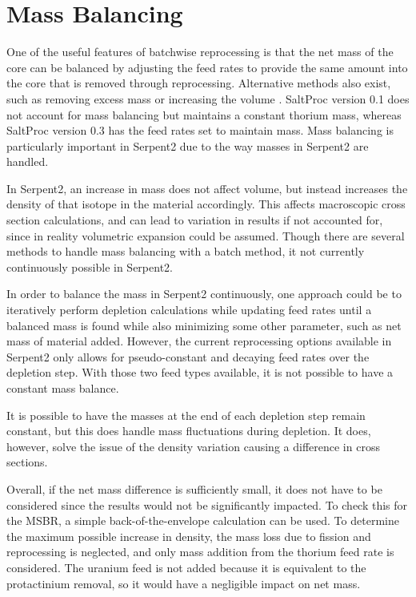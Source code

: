 \section{Mass Balancing}

One of the useful features of batchwise reprocessing is that the net mass of the core can be balanced by adjusting the feed rates to provide the same amount into the core that is removed through reprocessing. Alternative methods also exist, such as removing excess mass or increasing the volume \cite{ridley_method_2017}. SaltProc version 0.1 does not account for mass balancing but maintains a constant thorium mass, whereas SaltProc version 0.3 has the feed rates set to maintain mass. Mass balancing is particularly important in Serpent2 due to the way masses in Serpent2 are handled.

In Serpent2, an increase in mass does not affect volume, but instead increases the density of that isotope in the material accordingly. This affects macroscopic cross section calculations, and can lead to variation in results if not accounted for, since in reality volumetric expansion could be assumed. Though there are several methods to handle mass balancing with a batch method, it not currently continuously possible in Serpent2.

In order to balance the mass in Serpent2 continuously, one approach could be to iteratively perform depletion calculations while updating feed rates until a balanced mass is found while also minimizing some other parameter, such as net mass of material added. However, the current reprocessing options available in Serpent2 only allows for pseudo-constant and decaying feed rates over the depletion step. With those two feed types available, it is not possible to have a constant mass balance.

It is possible to have the masses at the end of each depletion step remain constant, but this does handle mass fluctuations during depletion. It does, however, solve the issue of the density variation causing a difference in cross sections.

Overall, if the net mass difference is sufficiently small, it does not have to be considered since the results would not be significantly impacted. To check this for the MSBR, a simple back-of-the-envelope calculation can be used. To determine the maximum possible increase in density, the mass loss due to fission and reprocessing is neglected, and only mass addition from the thorium feed rate is considered. The uranium feed is not added because it is equivalent to the protactinium removal, so it would have a negligible impact on net mass. 

